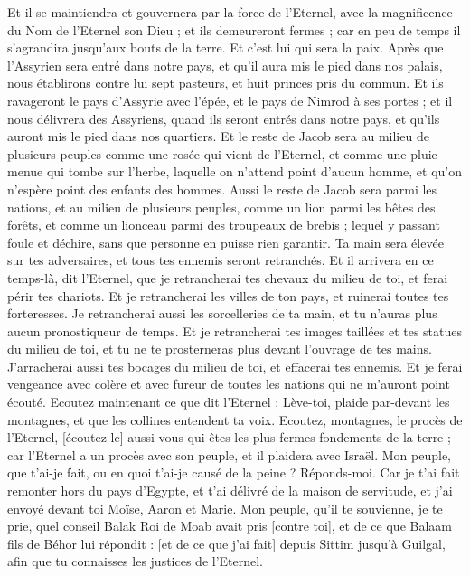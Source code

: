 \begin{multicols}{2}
Et il se maintiendra et gouvernera par la force de l'Eternel, avec la magnificence du Nom de l'Eternel son Dieu ; et ils demeureront fermes ; car en peu de temps il s'agrandira jusqu'aux bouts de la terre.
Et c'est lui qui sera la paix. Après que l'Assyrien sera entré dans notre pays, et qu'il aura mis le pied dans nos palais, nous établirons contre lui sept pasteurs, et huit princes pris du commun.
Et ils ravageront le pays d'Assyrie avec l'épée, et le pays de Nimrod à ses portes ; et il nous délivrera des Assyriens, quand ils seront entrés dans notre pays, et qu'ils auront mis le pied dans nos quartiers.
Et le reste de Jacob sera au milieu de plusieurs peuples comme une rosée qui vient de l'Eternel, et comme une pluie menue qui tombe sur l'herbe, laquelle on n'attend point d'aucun homme, et qu'on n'espère point des enfants des hommes.
Aussi le reste de Jacob sera parmi les nations, et au milieu de plusieurs peuples, comme un lion parmi les bêtes des forêts, et comme un lionceau parmi des troupeaux de brebis ; lequel y passant foule et déchire, sans que personne en puisse rien garantir.
Ta main sera élevée sur tes adversaires, et tous tes ennemis seront retranchés.
Et il arrivera en ce temps-là, dit l'Eternel, que je retrancherai tes chevaux du milieu de toi, et ferai périr tes chariots.
Et je retrancherai les villes de ton pays, et ruinerai toutes tes forteresses.
Je retrancherai aussi les sorcelleries de ta main, et tu n'auras plus aucun pronostiqueur de temps.
Et je retrancherai tes images taillées et tes statues du milieu de toi, et tu ne te prosterneras plus devant l'ouvrage de tes mains.
J'arracherai aussi tes bocages du milieu de toi, et effacerai tes ennemis.
Et je ferai vengeance avec colère et avec fureur de toutes les nations qui ne m'auront point écouté.
\VerseOne{}Ecoutez maintenant ce que dit l'Eternel : Lève-toi, plaide par-devant les montagnes, et que les collines entendent ta voix.
Ecoutez, montagnes, le procès de l'Eternel, [écoutez-le] aussi vous qui êtes les plus fermes fondements de la terre ; car l'Eternel a un procès avec son peuple, et il plaidera avec Israël.
Mon peuple, que t'ai-je fait, ou en quoi t'ai-je causé de la peine ? Réponds-moi.
Car je t'ai fait remonter hors du pays d'Egypte, et t'ai délivré de la maison de servitude, et j'ai envoyé devant toi Moïse, Aaron et Marie.
Mon peuple, qu'il te souvienne, je te prie, quel conseil Balak Roi de Moab avait pris [contre toi], et de ce que Balaam fils de Béhor lui répondit : [et de ce que j'ai fait] depuis Sittim jusqu'à Guilgal, afin que tu connaisses les justices de l'Eternel.

\end{multicols}
